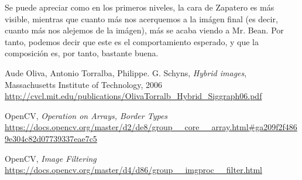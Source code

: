 \documentclass[11pt,a4paper]{article}
\begin{document}
Se puede apreciar como en los primeros niveles, la cara de Zapatero es más visible, mientras que cuanto más nos acerquemos
a la imágen final (es decir, cuanto más nos alejemos de la imágen), más se acaba viendo a Mr. Bean. Por tanto, podemos
decir que este es el comportamiento esperado, y que la composición es, por tanto, bastante buena.

\newpage

\begin{thebibliography}{5}

Aude Oliva, Antonio Torralba, Philippe. G. Schyns, \textit{Hybrid images}, Massachusetts Institute of Technology, 2006
\\\url{http://cvcl.mit.edu/publications/OlivaTorralb_Hybrid_Siggraph06.pdf}

OpenCV, \textit{Operation on Arrays, Border Types}
\\\url{https://docs.opencv.org/master/d2/de8/group__core__array.html#ga209f2f4869e304c82d07739337eae7c5}

OpenCV, \textit{Image Filtering}
\\\url{https://docs.opencv.org/master/d4/d86/group__imgproc__filter.html}

\end{thebibliography}
\end{document}
